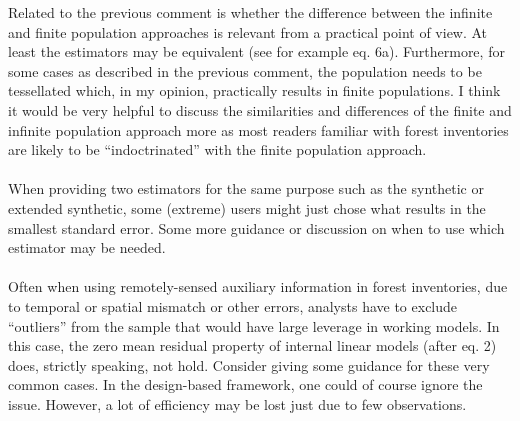 \documentclass{article}
\begin{document}
Related to the previous comment is whether the difference between the infinite and finite population approaches is relevant from a practical point of view. At least the estimators may be equivalent (see for example eq. 6a). Furthermore, for some cases as described in the previous comment, the population needs to be tessellated which, in my opinion, practically results in finite populations. I think it would be very helpful to discuss the similarities and differences of the finite and infinite population approach more as most readers familiar with forest inventories are likely to be “indoctrinated” with the finite population approach.\\

 \\

When providing two estimators for the same purpose such as the synthetic or extended synthetic, some (extreme) users might just chose what results in the smallest standard error. Some more guidance or discussion on when to use which estimator may be needed.\\

 \\

Often when using remotely-sensed auxiliary information in forest inventories, due to temporal or spatial mismatch or other errors, analysts have to exclude “outliers” from the sample that would have large leverage in working models. In this case, the zero mean residual property of internal linear models (after eq. 2) does, strictly speaking, not hold. Consider giving some guidance for these very common cases. In the design-based framework, one could of course ignore the issue. However, a lot of efficiency may be lost just due to few observations.\\
\end{document}
